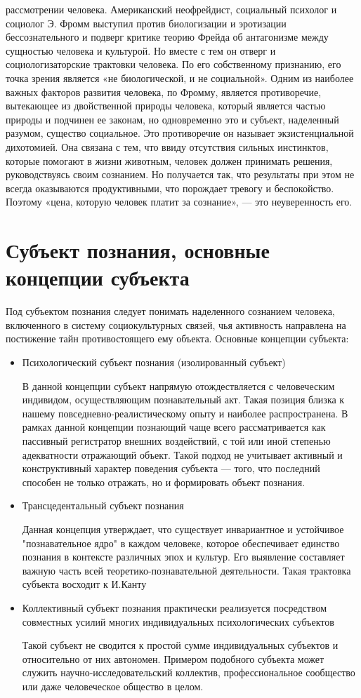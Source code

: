 \documentclass[12pt]{article}
\begin{document}
рассмотрении человека.
Американский неофрейдист, социальный психолог и социолог Э. Фромм выступил против биологизации и
эротизации бессознательного и подверг критике теорию Фрейда об антагонизме между сущностью человека и
культурой.  Но  вместе  с  тем  он  отверг  и  социологизаторские  трактовки  человека.  По  его  собственному
признанию,  его  точка  зрения  является  «не  биологической,  и  не  социальной».  Одним  из  наиболее  важных
факторов  развития  человека,  по  Фромму,  является  противоречие,  вытекающее  из  двойственной  природы
человека,  который  является  частью  природы  и  подчинен  ее  законам,  но  одновременно  это  и  субъект,
наделенный разумом, существо социальное. Это противоречие он называет экзистенциальной дихотомией. Она
связана  с  тем,  что  ввиду  отсутствия  сильных  инстинктов,  которые  помогают  в  жизни  животным,  человек
должен принимать решения, руководствуясь своим сознанием. Но получается так, что результаты при этом не
всегда оказываются продуктивными, что порождает тревогу и беспокойство. Поэтому «цена, которую человек
платит за сознание», — это неуверенность его.

\newpage
\section{Субъект познания, основные концепции субъекта}
Под  субъектом  познания  следует  понимать  наделенного  сознанием  человека,  включенного  в  систему
социокультурных связей, чья активность направлена на постижение тайн противостоящего ему объекта. 
Основные концепции субъекта:
\begin{itemize}
  \item Психологический субъект познания (изолированный субъект)
    
    В данной концепции субъект напрямую
отождествляется с человеческим индивидом, осуществляющим познавательный акт. Такая позиция близка к
нашему  повседневно-реалистическому  опыту  и  наиболее  распространена.  В  рамках  данной  концепции
познающий чаще всего рассматривается как пассивный регистратор внешних воздействий, с той или иной
степенью адекватности отражающий объект. Такой подход не учитывает активный и конструктивный характер
поведения субъекта — того, что последний способен не только отражать, но и формировать объект познания.
   \item Трансцедентальный субъект познания
     
     Данная концепция утверждает, что существует инвариантное и
устойчивое "познавательное ядро" в каждом человеке, которое обеспечивает единство познания в контексте
различных  эпох  и  культур.  Его  выявление  составляет  важную  часть  всей  теоретико-познавательной
деятельности. Такая трактовка субъекта восходит к И.Канту
    \item  Коллективный  субъект  познания  практически  реализуется  посредством  совместных  усилий  многих
индивидуальных психологических субъектов

Такой субъект не сводится к простой сумме индивидуальных
субъектов  и  относительно  от  них  автономен.  Примером  подобного  субъекта  может  служить  научно-исследовательский коллектив, профессиональное сообщество или даже человеческое общество в целом.
\end{itemize}
\newpage
\end{document}
